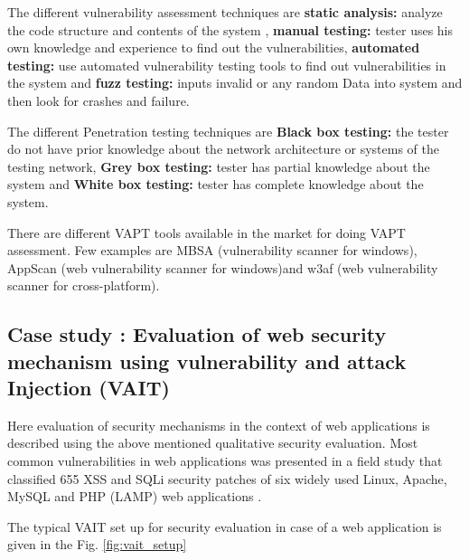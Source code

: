 \documentclass[pdftex,english,oribibl]{llncs}
\begin{document}
The different vulnerability assessment techniques are \textbf{static analysis:} analyze the code structure and contents of the system , \textbf{manual testing:} tester uses his own knowledge and experience to find out the vulnerabilities, \textbf{automated testing:} use automated vulnerability testing tools to find out vulnerabilities in the system and \textbf{fuzz testing:} inputs invalid or any random Data into system and then look for crashes and failure.

The different Penetration testing techniques are \textbf{Black box testing:} the tester do not have prior knowledge about the network architecture or systems of the testing network, \textbf{Grey box testing:} tester has partial knowledge about the system and \textbf{White box testing:} tester has complete knowledge about the system.

There are different VAPT tools available in the market for doing VAPT assessment. Few examples are MBSA (vulnerability scanner for windows), AppScan (web vulnerability scanner for windows)and w3af (web vulnerability scanner for cross-platform).

\subsection{Case study : Evaluation of web security mechanism using vulnerability and attack Injection (VAIT)}
Here evaluation of security mechanisms in the context of web applications is described using the above mentioned qualitative security evaluation. Most common vulnerabilities in web applications was presented in a field study that classified 655 XSS and SQLi security patches of six widely used Linux, Apache, MySQL and PHP (LAMP) web applications \cite{6629992_Fronseca}. 

The typical VAIT set up for security evaluation in case of a web application is given in the Fig. \ref{fig:vait_setup}
\end{document}
